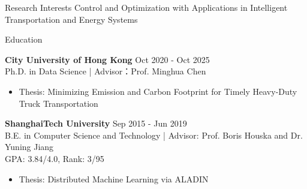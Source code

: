 \documentclass{resume} %
\begin{document}



\begin{rSection}{Research Interests}
        {
        Control and Optimization with Applications in Intelligent Transportation and Energy Systems
        }
\end{rSection}


\begin{rSection}{Education}



\textbf{City University of Hong Kong}  \hfill {Oct 2020 - Oct 2025} 
\\ Ph.D. in Data Science | Advisor：Prof. Minghua Chen 
\begin{itemize}
    \item Thesis: Minimizing Emission and Carbon Footprint for Timely Heavy-Duty Truck Transportation
\end{itemize}

\textbf{ShanghaiTech University}  \hfill {Sep 2015 - Jun 2019} 
\\ B.E. in Computer Science and Technology | Advisor: Prof. Boris Houska and Dr. Yuning Jiang
\\ GPA: 3.84/4.0, Rank: 3/95
\begin{itemize}
        \item Thesis: Distributed Machine Learning via ALADIN
\end{itemize}

\end{rSection}
\end{document}

